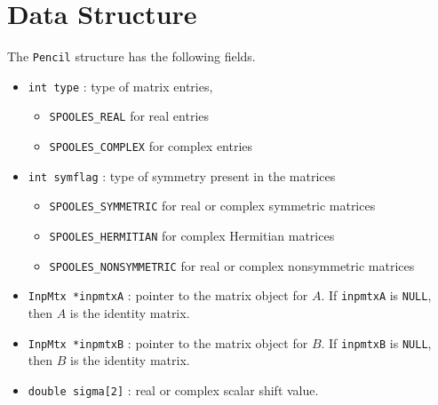 \par
\section{Data Structure}
\label{section:Pencil:dataStructure}
\par
\par
The {\tt Pencil} structure has the following fields.
\begin{itemize}
\item
{\tt int type} : type of matrix entries,
\begin{itemize}
\item {\tt SPOOLES\_REAL} for real entries
\item {\tt SPOOLES\_COMPLEX} for complex entries
\end{itemize}
\item
{\tt int symflag} : type of symmetry present in the matrices
\begin{itemize}
\item {\tt SPOOLES\_SYMMETRIC} for real or complex symmetric matrices 
\item {\tt SPOOLES\_HERMITIAN} for complex Hermitian matrices 
\item {\tt SPOOLES\_NONSYMMETRIC} 
for real or complex nonsymmetric matrices 
\end{itemize}
\item
{\tt InpMtx *inpmtxA} : pointer to the matrix object for $A$.
If {\tt inpmtxA} is {\tt NULL}, then $A$ is the identity matrix.
\item
{\tt InpMtx *inpmtxB} : pointer to the matrix object for $B$.
If {\tt inpmtxB} is {\tt NULL}, then $B$ is the identity matrix.
\item
{\tt double sigma[2]} : real or complex scalar shift value.
\end{itemize}
